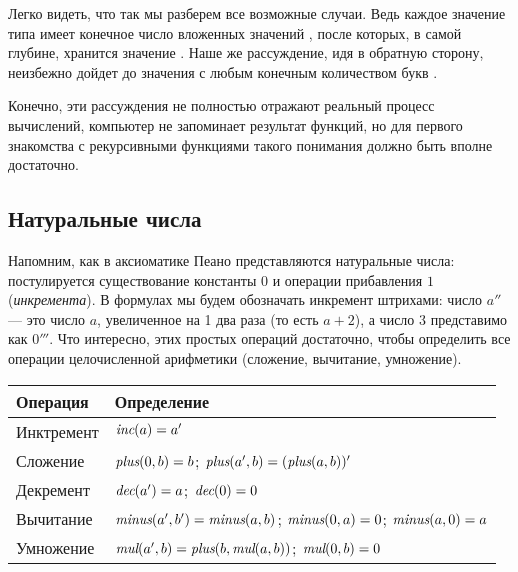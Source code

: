 Легко видеть, что так мы разберем все возможные случаи. Ведь каждое 
значение типа  имеет конечное число вложенных значений , после 
которых, в самой глубине, хранится значение . Наше же рассуждение, 
идя в обратную сторону, неизбежно дойдет до значения с любым конечным 
количеством букв .

Конечно, эти рассуждения не полностью отражают реальный процесс вычислений, 
компьютер не запоминает результат функций, но для первого знакомства с 
рекурсивными функциями такого понимания должно быть вполне достаточно.

\subsection{Натуральные числа}

Напомним, как в аксиоматике Пеано представляются натуральные числа:
постулируется существование константы $0$ и операции прибавления $1$ 
(\emph{инкремента}). 
В формулах мы будем обозначать инкремент штрихами:
число $a''$ --- это число $a$, увеличенное на 1 два раза (то есть $a + 2$), 
а число $3$ представимо как $0'''$. 
Что интересно, этих простых операций достаточно, чтобы определить все 
операции целочисленной арифметики (сложение, вычитание, 
умножение).

\begin{tabular}{ll}\\
\hline
Операция&Определение\\
\hline
Инктремент&$\textit{inc} (a) = a'$\\
Сложение&$\textit{plus} (0,b) = b$; $\textit{plus} (a',b) = (\textit{plus} (a,b))'$\\
Декремент&$\textit{dec} (a') = a$; $\textit{dec} (0) = 0$\\
Вычитание&$\textit{minus} (a',b') = \textit{minus} (a,b)$; $\textit{minus} (0,a) = 0$; $\textit{minus} (a,0) = a$\\
Умножение&$\textit{mul} (a',b) = \textit{plus} (b, \textit{mul} (a,b))$; $\textit{mul} (0,b) = 0$\\
\hline
\end{tabular}

